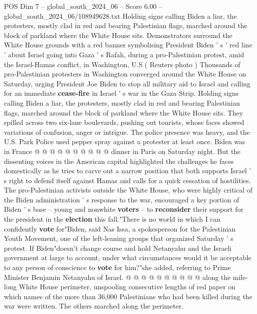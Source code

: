 \begin{textsample}{POS Dim 7 – global\_south\_2024\_06 – Score 6.00 – global\_south\_2024\_06/108949628.txt}  \label{ex:f7_pos_241}
Holding signs calling Biden a liar, the protesters, mostly clad in red and bearing Palestinian flags, marched around the block of parkland where the White House sits.
Demonstrators surround the White House grounds with a red banner symbolising President Biden ' s ' red line ' about Israel going into Gaza ' s Rafah, during a pro-Palestinian protest, amid the Israel-Hamas conflict, in Washington, U.S ( Reuters photo ) Thousands of pro-Palestinian protesters in Washington converged around the White House on Saturday, urging President Joe Biden to stop all military aid to Israel and calling for an immediate \textbf{cease-fire} in Israel ' s war in the Gaza Strip.
Holding signs calling Biden a liar, the protesters, mostly clad in red and bearing Palestinian flags, marched around the block of parkland where the White House sits.
They spilled across two six-lane boulevards, pushing out tourists, whose faces showed variations of confusion, anger or intrigue.
The police presence was heavy, and the U.S.
Park Police used pepper spray against a protester at least once.
Biden was in France @ @ @ @ @ @ @ @ @ @ dinner in Paris on Saturday night.
But the dissenting voices in the American capital highlighted the challenges he faces domestically as he tries to carve out a narrow position that both supports Israel ' s right to defend itself against Hamas and calls for a quick cessation of hostilities.
The pro-Palestinian activists outside the White House, who were highly critical of the Biden administration ' s response to the war, encouraged a key portion of Biden ' s base -- young and nonwhite \textbf{voters} -- to \textbf{reconsider} their support for the president in the \textbf{election} this fall."There is no world in which I can confidently \textbf{vote} for"Biden, said Nas Issa, a spokesperson for the Palestinian Youth Movement, one of the left-leaning groups that organized Saturday ' s protest.
If Biden"doesn't change course and hold Netanyahu and the Israeli government at large to account, under what circumstances would it be acceptable to any person of conscience to \textbf{vote} for him?"she added, referring to Prime Minister Benjamin Netanyahu of Israel. @ @ @ @ @ @ @ @ @ @ along the mile-long White House perimeter, unspooling consecutive lengths of red paper on which names of the more than 36,000 Palestinians who had been killed during the war were written.
The others marched along the perimeter.

\end{textsample}
